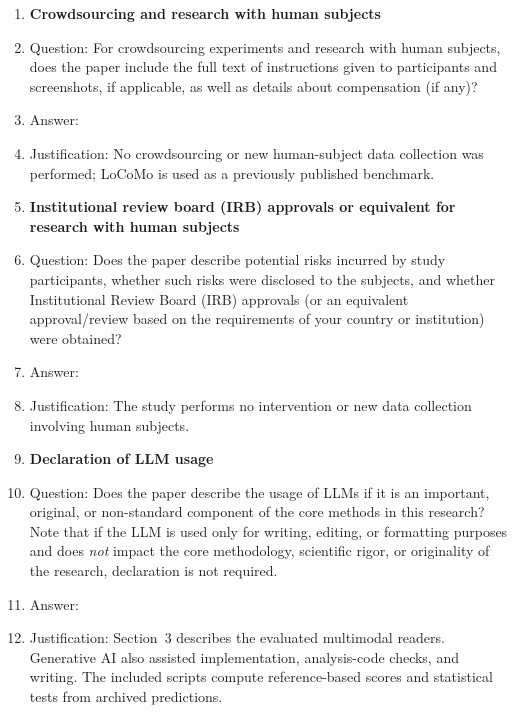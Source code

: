 \begin{enumerate}
\newpage
\item {\bf Crowdsourcing and research with human subjects}
    \item[] Question: For crowdsourcing experiments and research with human subjects, does the paper include the full text of instructions given to participants and screenshots, if applicable, as well as details about compensation (if any)? 
    \item[] Answer: \answerNA{}
    \item[] Justification: No crowdsourcing or new human-subject data collection was performed; LoCoMo is used as a previously published benchmark.

\item {\bf Institutional review board (IRB) approvals or equivalent for research with human subjects}
    \item[] Question: Does the paper describe potential risks incurred by study participants, whether such risks were disclosed to the subjects, and whether Institutional Review Board (IRB) approvals (or an equivalent approval/review based on the requirements of your country or institution) were obtained?
    \item[] Answer: \answerNA{}
    \item[] Justification: The study performs no intervention or new data collection involving human subjects.

\item {\bf Declaration of LLM usage}
    \item[] Question: Does the paper describe the usage of LLMs if it is an important, original, or non-standard component of the core methods in this research? Note that if the LLM is used only for writing, editing, or formatting purposes and does \emph{not} impact the core methodology, scientific rigor, or originality of the research, declaration is not required.
    \item[] Answer: \answerYes{}
    \item[] Justification: Section~3 describes the evaluated multimodal readers. Generative AI also assisted implementation, analysis-code checks, and writing. The included scripts compute reference-based scores and statistical tests from archived predictions.

\end{enumerate}
